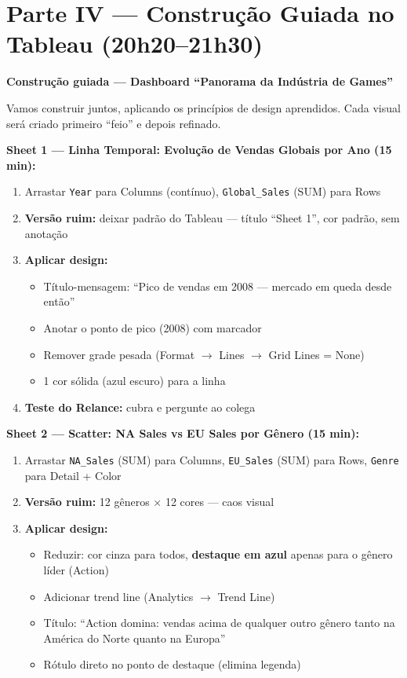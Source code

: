 \section{Parte IV — Construção Guiada no Tableau (20h20–21h30)}

\begin{SolvedBox}
\textbf{Construção guiada — Dashboard ``Panorama da Indústria de Games''}

Vamos construir juntos, aplicando os princípios de design aprendidos.
Cada visual será criado primeiro ``feio'' e depois refinado.

\textbf{Sheet 1 — Linha Temporal: Evolução de Vendas Globais por Ano (15 min):}
\begin{enumerate}
  \item Arrastar \texttt{Year} para Columns (contínuo),
  \texttt{Global\_Sales} (SUM) para Rows
  \item \textbf{Versão ruim:} deixar padrão do Tableau —
  título ``Sheet 1'', cor padrão, sem anotação
  \item \textbf{Aplicar design:}
  \begin{itemize}
    \item Título-mensagem: ``Pico de vendas em 2008 — mercado em queda desde então''
    \item Anotar o ponto de pico (2008) com marcador
    \item Remover grade pesada (Format $\to$ Lines $\to$ Grid Lines = None)
    \item 1 cor sólida (azul escuro) para a linha
  \end{itemize}
  \item \textbf{Teste do Relance:} cubra e pergunte ao colega
\end{enumerate}

\textbf{Sheet 2 — Scatter: NA Sales vs EU Sales por Gênero (15 min):}
\begin{enumerate}
  \item Arrastar \texttt{NA\_Sales} (SUM) para Columns,
  \texttt{EU\_Sales} (SUM) para Rows, \texttt{Genre} para Detail + Color
  \item \textbf{Versão ruim:} 12 gêneros × 12 cores — caos visual
  \item \textbf{Aplicar design:}
  \begin{itemize}
    \item Reduzir: cor cinza para todos, \textbf{destaque em azul}
    apenas para o gênero líder (Action)
    \item Adicionar trend line (Analytics $\to$ Trend Line)
    \item Título: ``Action domina: vendas acima de qualquer outro gênero
    tanto na América do Norte quanto na Europa''
    \item Rótulo direto no ponto de destaque (elimina legenda)
  \end{itemize}
\end{enumerate}


\end{SolvedBox}
